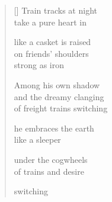 \documentclass[12pt,a4paper]{article}
\begin{document}

\newpage


\settowidth{\versewidth}{of freight trains switching}

\bigskip

\begin{verse}[\versewidth]
  Train tracks at night \\
  take a pure heart in

  like a casket is raised \\
  on friends' shoulders \\
  strong as iron

  Among his own shadow \\
  and the dreamy clanging \\
  of freight trains switching

  he embraces the earth \\
  like a sleeper

  under the cogwheels \\
  of trains and desire

  switching
\end{verse}
\end{document}
